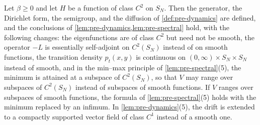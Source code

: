 \begin{lemma}\label{lem:inf-dynamics}
Let $\beta\ge0$ and let $H$ be a function of class $C^2$ on $S_N$. Then the generator, the Dirichlet form, the semigroup, and the diffusion of \cref{def:pre-dynamics} are defined, and the conclusions of \cref{lem:pre-dynamics,lem:pre-spectral} hold, with the following changes: the eigenfunctions are of class $C^2$ but need not be smooth, the operator $-L$ is essentially self-adjoint on $C^2(S_N)$ instead of on smooth functions, the transition density $p_t(x,y)$ is continuous on $(0,\infty)\times S_N\times S_N$ instead of smooth, and in the min--max principle of \cref{lem:pre-spectral}(5), the minimum is attained at a subspace of $C^2(S_N)$, so that $V$ may range over subspaces of $C^2(S_N)$ instead of subspaces of smooth functions. If $V$ ranges over subspaces of smooth functions, the formula of \cref{lem:pre-spectral}(5) holds with the minimum replaced by an infimum. In \cref{lem:pre-dynamics}(5), the drift is extended to a compactly supported vector field of class $C^1$ instead of a smooth one.
\end{lemma}

